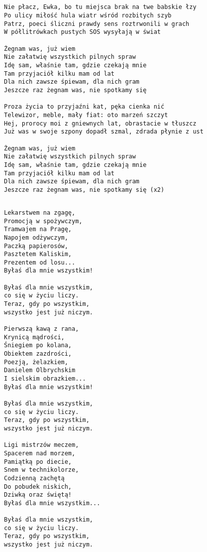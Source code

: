 \documentclass[12pt]{article}
\begin{document}
\subsection*{}
\begin{verbatim}
Nie płacz, Ewka, bo tu miejsca brak na twe babskie łzy
Po ulicy miłość hula wiatr wśród rozbitych szyb
Patrz, poeci śliczni prawdy sens roztrwonili w grach
W półlitrówkach pustych SOS wysyłają w świat

Żegnam was, już wiem
Nie załatwię wszystkich pilnych spraw
Idę sam, właśnie tam, gdzie czekają mnie
Tam przyjaciół kilku mam od lat
Dla nich zawsze śpiewam, dla nich gram
Jeszcze raz żegnam was, nie spotkamy się

Proza życia to przyjaźni kat, pęka cienka nić
Telewizor, meble, mały fiat: oto marzeń szczyt
Hej, prorocy moi z gniewnych lat, obrastacie w tłuszcz
Już was w swoje szpony dopadł szmal, zdrada płynie z ust

Żegnam was, już wiem
Nie załatwię wszystkich pilnych spraw
Idę sam, właśnie tam, gdzie czekają mnie
Tam przyjaciół kilku mam od lat
Dla nich zawsze śpiewam, dla nich gram
Jeszcze raz żegnam was, nie spotkamy się (x2)
\end{verbatim}
\clearpage

\subsection*{}
\begin{verbatim}
Lekarstwem na zgagę,
Promocją w spożywczym,
Tramwajem na Pragę,
Napojem odżywczym,
Paczką papierosów,
Pasztetem Kaliskim,
Prezentem od losu...
Byłaś dla mnie wszystkim!

Byłaś dla mnie wszystkim,
co się w życiu liczy.
Teraz, gdy po wszystkim,
wszystko jest już niczym.

Pierwszą kawą z rana,
Krynicą mądrości,
Śniegiem po kolana,
Obiektem zazdrości,
Poezją, żelazkiem,
Danielem Olbrychskim
I sielskim obrazkiem...
Byłaś dla mnie wszystkim!

Byłaś dla mnie wszystkim,
co się w życiu liczy.
Teraz, gdy po wszystkim,
wszystko jest już niczym.

Ligi mistrzów meczem,
Spacerem nad morzem,
Pamiątką po diecie,
Snem w technikolorze,
Codzienną zachętą
Do pobudek niskich,
Dziwką oraz świętą!
Byłaś dla mnie wszystkim...

Byłaś dla mnie wszystkim,
co się w życiu liczy.
Teraz, gdy po wszystkim,
wszystko jest już niczym.
\end{verbatim}
\clearpage
\end{document}
